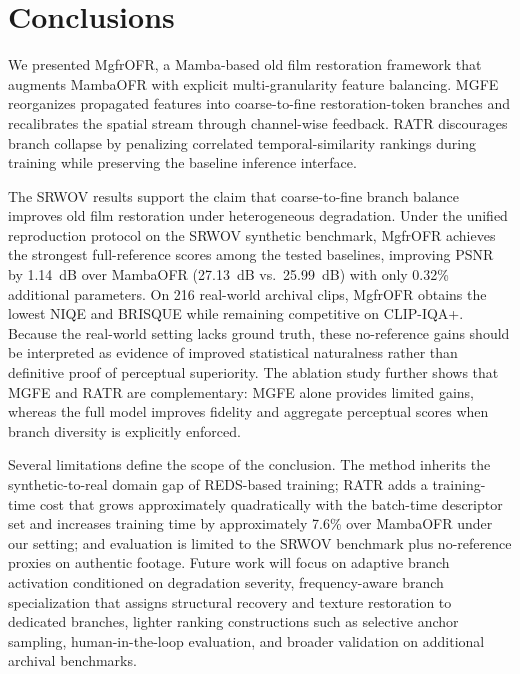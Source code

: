 \section{Conclusions}
\label{sec:conclusion}

We presented MgfrOFR, a Mamba-based old film restoration framework that augments MambaOFR with explicit multi-granularity feature balancing. MGFE reorganizes propagated features into coarse-to-fine restoration-token branches and recalibrates the spatial stream through channel-wise feedback. RATR discourages branch collapse by penalizing correlated temporal-similarity rankings during training while preserving the baseline inference interface.

The SRWOV results support the claim that coarse-to-fine branch balance improves old film restoration under heterogeneous degradation. Under the unified reproduction protocol on the SRWOV synthetic benchmark, MgfrOFR achieves the strongest full-reference scores among the tested baselines, improving PSNR by 1.14~dB over MambaOFR (27.13~dB vs.\ 25.99~dB) with only 0.32\% additional parameters. On 216 real-world archival clips, MgfrOFR obtains the lowest NIQE and BRISQUE while remaining competitive on CLIP-IQA+. Because the real-world setting lacks ground truth, these no-reference gains should be interpreted as evidence of improved statistical naturalness rather than definitive proof of perceptual superiority. The ablation study further shows that MGFE and RATR are complementary: MGFE alone provides limited gains, whereas the full model improves fidelity and aggregate perceptual scores when branch diversity is explicitly enforced.

Several limitations define the scope of the conclusion. The method inherits the synthetic-to-real domain gap of REDS-based training; RATR adds a training-time cost that grows approximately quadratically with the batch-time descriptor set and increases training time by approximately 7.6\% over MambaOFR under our setting; and evaluation is limited to the SRWOV benchmark plus no-reference proxies on authentic footage. Future work will focus on adaptive branch activation conditioned on degradation severity, frequency-aware branch specialization that assigns structural recovery and texture restoration to dedicated branches, lighter ranking constructions such as selective anchor sampling, human-in-the-loop evaluation, and broader validation on additional archival benchmarks.
